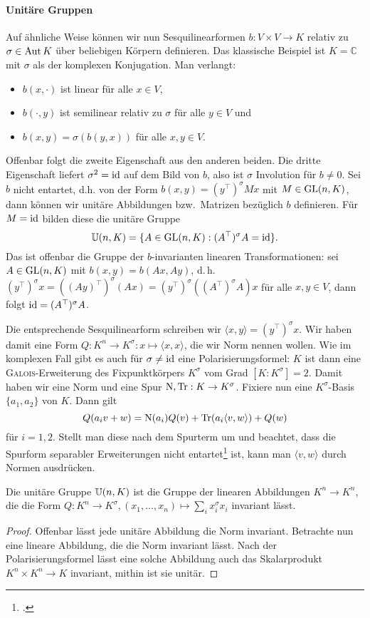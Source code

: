 \paragraph{Unitäre Gruppen} Auf ähnliche Weise können wir nun Sesquilinearformen $b: V \times V \to K$ relativ zu $\sigma \in \operatorname{Aut} K$ über beliebigen Körpern definieren. Das klassische Beispiel ist $K = \mathbb C$ mit $\sigma$ als der komplexen Konjugation. Man verlangt:
\begin{itemize}
\item $b(x, \cdot)$ ist linear für alle $x \in V$,
\item $b(\cdot, y)$ ist semilinear relativ zu $\sigma$ für alle $y \in V$ und
\item $b(x,y) = \sigma(b(y,x))$ für alle $x,y \in V$.
\end{itemize}
Offenbar folgt die zweite Eigenschaft aus den anderen beiden. Die dritte Eigenschaft liefert $\sigma^2 = \operatorname{id}$ auf dem Bild von $b$, also ist $\sigma$ Involution für $b \neq 0$. Sei $b$ nicht entartet, d.h. von der Form $b(x,y) = (y^\top)^\sigma M x$ mit $M \in \mathrm{GL}(n,K)$, dann können wir unitäre Abbildungen bzw.~Matrizen bezüglich $b$ definieren. Für $M = \operatorname{id}$ bilden diese die unitäre Gruppe
\begin{equation}
\mathbb U(n,K) = \{ A \in \mathrm{GL}(n,K): (A^\top)^\sigma A = \operatorname{id} \}.
\end{equation}
Das ist offenbar die Gruppe der $b$-invarianten linearen Transformationen: sei $A \in \mathrm{GL}(n,K)$ mit $b(x,y) = b(Ax,Ay)$, d.\,h. $(y^\top)^\sigma x = ((Ay)^\top)^\sigma (Ax) = (y^\top)^\sigma ((A^\top)^\sigma A) x$ für alle $x, y \in V$, dann folgt $\operatorname{id} = (A^\top)^\sigma A$.

Die entsprechende Sesquilinearform schreiben wir $\langle x, y \rangle = (y^\top)^\sigma x$. Wir haben damit eine Form $Q: K^n \to K^\sigma: x \mapsto \langle x, x \rangle$, die wir Norm nennen wollen. Wie im komplexen Fall gibt es auch für $\sigma \neq \operatorname{id}$ eine Polarisierungsformel: $K$ ist dann eine \textsc{Galois}-Erweiterung des Fixpunktkörpers $K^\sigma$ vom Grad $[K:K^\sigma] = 2$. Damit haben wir eine Norm und eine Spur $\operatorname{N}, \operatorname{Tr}: K \rightarrow K^\sigma$. Fixiere nun eine $K^\sigma$-Basis $\{a_1, a_2\}$ von $K$. Dann gilt
\begin{equation*}
Q(a_i v + w) = \operatorname{N}(a_i) Q(v) + \operatorname{Tr}(a_i \langle v, w \rangle) + Q(w)
\end{equation*}
für $i = 1,2$. Stellt man diese nach dem Spurterm um und beachtet, dass die Spurform separabler Erweiterungen nicht entartet\footcite[S.~199, Satz~7]{Bosch} ist, kann man $\langle v, w \rangle$ durch Normen ausdrücken.
\begin{fact} \label{fact:norminv}
Die unitäre Gruppe $\mathbb U(n,K)$ ist die Gruppe der linearen Abbildungen $K^n \to K^n$, die die Form $Q: K^n \to K^\sigma, (x_1, \dots, x_n) \mapsto \sum_i x_i^\sigma x_i$ invariant lässt.
\end{fact}
\begin{proof}
Offenbar lässt jede unitäre Abbildung die Norm invariant. Betrachte nun eine lineare Abbildung, die die Norm invariant lässt. Nach der Polarisierungsformel lässt eine solche Abbildung auch das Skalarprodukt $K^n \times K^n \to K$ invariant, mithin ist sie unitär.
\end{proof}

